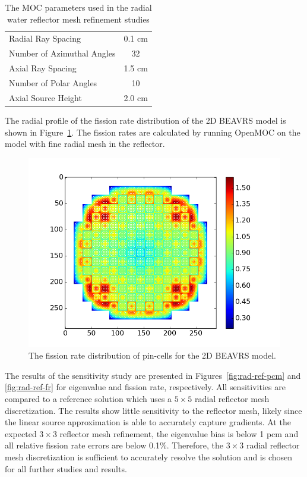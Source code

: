\begin{table}[ht]
	\centering
	\caption{The MOC parameters used in the radial water reflector mesh refinement studies}
	\medskip
	\begin{tabular}{lc}
		\hline
		Radial Ray Spacing & 0.1 cm \\
		Number of Azimuthal Angles & 32 \\
		Axial Ray Spacing & 1.5 cm \\
		Number of Polar Angles & 10 \\
		Axial Source Height & 2.0 cm \\
		\hline
	\end{tabular}
	\label{tab:rad-ref-refinement-params}
\end{table}

The radial profile of the fission rate distribution of the 2D BEAVRS model is shown in Figure~\ref{fig:beavrs-2d-radial}. The fission rates are calculated by running OpenMOC on the model with fine radial mesh in the reflector.

\begin{figure}[h!]
	\centering
	\includegraphics[width=0.9\linewidth]{figures/results/rr-plots/beavrs-2d-radial.png}
	\caption[]{The fission rate distribution of pin-cells for the 2D BEAVRS model.}
	\label{fig:beavrs-2d-radial}
\end{figure}

The results of the sensitivity study are presented in Figures~\ref{fig:rad-ref-pcm} and \ref{fig:rad-ref-fr} for eigenvalue and fission rate, respectively. All sensitivities are compared to a reference solution which uses a $5\times 5$ radial reflector mesh discretization. The results show little sensitivity to the reflector mesh, likely since the linear source approximation is able to accurately capture gradients. At the expected $3 \times 3$ reflector mesh refinement, the eigenvalue bias is below 1 pcm and all relative fission rate errors are below 0.1\%. Therefore, the  $3 \times 3$ radial reflector mesh discretization is sufficient to accurately resolve the solution and is chosen for all further studies and results.

